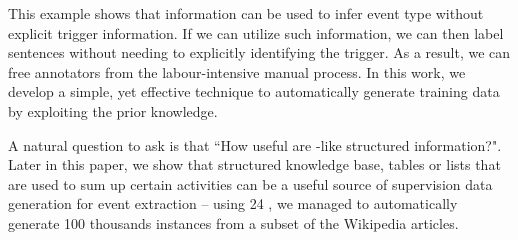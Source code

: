 This example shows that \CVT information can be used to infer event type without explicit trigger information. If we can utilize such \CVT
information, we can then label sentences without needing to explicitly identifying the trigger. As a result, we can free annotators from
the labour-intensive manual process. In this work, we develop a simple, yet effective technique to automatically generate training data by
exploiting the prior \CVT knowledge.

A natural question to ask is that ``How useful are \CVT-like structured information?". Later in this paper, we show that structured
knowledge base, tables or lists that are used to sum up certain activities can be a useful source of supervision data generation for event
extraction -- using 24 \CVTs, we managed to automatically generate 100 thousands instances from a subset of the Wikipedia articles.

%



